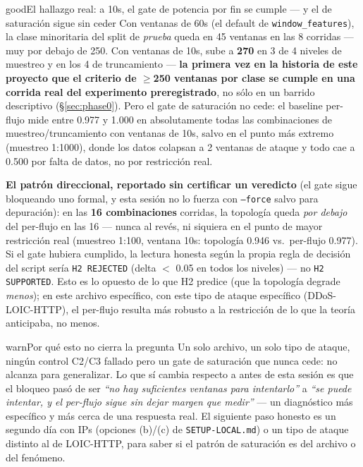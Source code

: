\documentclass[11pt]{article}
\newcommand{\code}[1]{\texttt{\small #1}}
\begin{document}
\begin{cbox}{good}{El hallazgo real: a 10s, el gate de potencia por fin se cumple --- y el de saturación sigue sin ceder}
Con ventanas de 60s (el default de \code{window\_features}), la clase minoritaria del split de
\emph{prueba} queda en 45 ventanas en las 8 corridas --- muy por debajo de 250. Con ventanas de
10s, sube a \textbf{270} en 3 de 4 niveles de muestreo y en los 4 de truncamiento ---
\textbf{la primera vez en la historia de este proyecto que el criterio de $\geq$250 ventanas por
clase se cumple en una corrida real del experimento preregistrado}, no sólo en un barrido
descriptivo (\S\ref{sec:phase0}). Pero el gate de saturación no cede: el baseline per-flujo mide
entre 0.977 y 1.000 en absolutamente todas las combinaciones de muestreo/truncamiento con ventanas
de 10s, salvo en el punto más extremo (muestreo 1:1000), donde los datos colapsan a 2 ventanas de
ataque y todo cae a 0.500 por falta de datos, no por restricción real.
\end{cbox}

\textbf{El patrón direccional, reportado sin certificar un veredicto} (el gate sigue bloqueando
uno formal, y esta sesión no lo fuerza con \code{--force} salvo para depuración): en las
\textbf{16 combinaciones} corridas, la topología queda \emph{por debajo} del per-flujo en las 16
--- nunca al revés, ni siquiera en el punto de mayor restricción real (muestreo 1:100, ventana
10s: topología 0.946 vs.\ per-flujo 0.977). Si el gate hubiera cumplido, la lectura honesta según
la propia regla de decisión del script sería \code{H2 REJECTED} (delta $<$ 0.05 en todos los
niveles) --- no \code{H2 SUPPORTED}. Esto es lo opuesto de lo que H2 predice (que la topología
degrade \emph{menos}); en este archivo específico, con este tipo de ataque específico
(DDoS-LOIC-HTTP), el per-flujo resulta más robusto a la restricción de lo que la teoría
anticipaba, no menos.

\begin{cbox}{warn}{Por qué esto no cierra la pregunta}
Un solo archivo, un solo tipo de ataque, ningún control C2/C3 fallado pero un gate de saturación
que nunca cede: no alcanza para generalizar. Lo que sí cambia respecto a antes de esta sesión es
que el bloqueo pasó de ser \textit{``no hay suficientes ventanas para intentarlo''} a
\textit{``se puede intentar, y el per-flujo sigue sin dejar margen que medir''} --- un diagnóstico
más específico y más cerca de una respuesta real. El siguiente paso honesto es un segundo día con
IPs (opciones (b)/(c) de \code{SETUP-LOCAL.md}) o un tipo de ataque distinto al de LOIC-HTTP, para
saber si el patrón de saturación es del archivo o del fenómeno.
\end{cbox}
\end{document}
